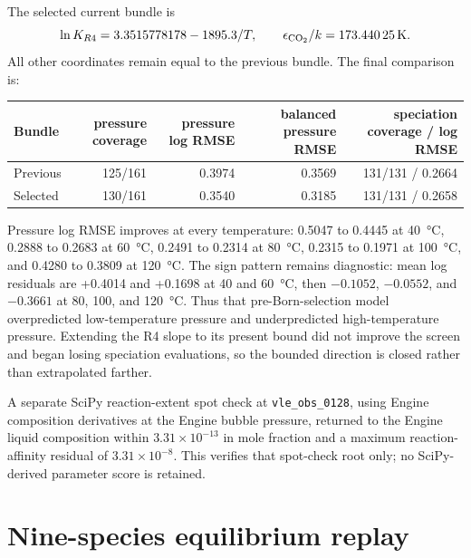\documentclass[10pt,oneside]{scrartcl}
\begin{document}
The selected current bundle is
\begin{equation*}
\ln K_{R4}=3.3515778178-1895.3/T,
\qquad \epsilon_{\ce{CO2}}/k=\SI{173.44025}{\kelvin}.
\end{equation*}
All other coordinates remain equal to the previous bundle. The final
comparison is:

\begin{center}
\footnotesize
\begin{tabularx}{\textwidth}{@{}Yrrrr@{}}
\toprule
Bundle & pressure coverage & pressure log RMSE & balanced pressure RMSE & speciation coverage / log RMSE \\
\midrule
Previous & 125/161 & 0.3974 & 0.3569 & 131/131 / 0.2664 \\
Selected & 130/161 & 0.3540 & 0.3185 & 131/131 / 0.2658 \\
\bottomrule
\end{tabularx}
\end{center}

Pressure log RMSE improves at every temperature: 0.5047 to 0.4445 at
\SI{40}{\celsius}, 0.2888 to 0.2683 at \SI{60}{\celsius}, 0.2491 to 0.2314
at \SI{80}{\celsius}, 0.2315 to 0.1971 at \SI{100}{\celsius}, and 0.4280 to
0.3809 at \SI{120}{\celsius}. The sign pattern remains diagnostic: mean
log residuals are +0.4014 and +0.1698 at 40 and \SI{60}{\celsius}, then
$-0.1052$, $-0.0552$, and $-0.3661$ at 80, 100, and \SI{120}{\celsius}.
Thus that pre-Born-selection model overpredicted low-temperature pressure and
underpredicted high-temperature pressure. Extending the R4 slope to its present
bound did not improve the screen and began losing speciation evaluations, so
the bounded direction is closed rather than extrapolated farther.

A separate SciPy reaction-extent spot check at \texttt{vle\_obs\_0128}, using
Engine composition derivatives at the Engine bubble pressure, returned to the
Engine liquid composition within $3.31\times10^{-13}$ in mole fraction and a
maximum reaction-affinity residual of $3.31\times10^{-8}$. This verifies that
spot-check root only; no SciPy-derived parameter score is retained.
\endgroup

\section{Nine-species equilibrium replay}
\label{sec:spec-replay}
\end{document}
